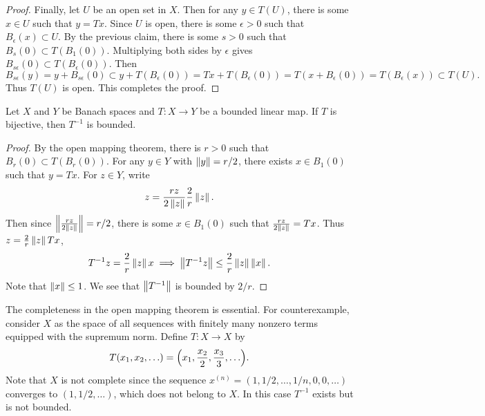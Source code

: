 \begin{proof}
    Finally, let $U$ be an open set in $X$. Then for any $y\in T(U)$, there is 
    some $x\in U$ such that $y = Tx$. Since $U$ is open, there is some $\epsilon>0$ 
    such that $B_\epsilon(x)\subset U$. By the previous claim, there is some $s>0$ 
    such that $B_s(0)\subset T(B_1(0))$. Multiplying both sides by $\epsilon$ gives
    $B_{s\epsilon}(0)\subset T(B_\epsilon(0))$. Then 
    \begin{equation*}
        B_{s\epsilon}(y) = y + B_{s\epsilon}(0) \subset y + T(B_\epsilon(0)) 
        = Tx + T(B_\epsilon(0)) = T(x + B_\epsilon(0))
        = T(B_\epsilon(x)) \subset T(U).
    \end{equation*}
    Thus $T(U)$ is open. This completes the proof.
\end{proof}

\begin{theorem}
    Let $X$ and $Y$ be Banach spaces and $T:X\to Y$ be a bounded linear map. If 
    $T$ is bijective, then $T^{-1}$ is bounded.
\end{theorem}
\begin{proof}
    By the open mapping theorem, there is $r>0$ such that $B_r(0)\subset T(B_r(0))$. 
    For any $y\in Y$ with $\left\lVert {y} \right\rVert = r/2$, there exists $x\in B_1(0)$ such that 
    $y = Tx$. For $z\in Y$, write 
    \begin{equation*}
        z = \frac{rz}{2\left\lVert {z} \right\rVert}\frac{2}{r}\left\lVert {z} \right\rVert.
    \end{equation*}
    Then since $\left\lVert {\frac{rz}{2\left\lVert {z} \right\rVert}} \right\rVert = r/2$, there is some $x\in B_1(0)$ 
    such that $\frac{rz}{2\left\lVert {z} \right\rVert} = Tx$. Thus $z = \frac{2}{r}\left\lVert {z} \right\rVert Tx$, 
    \begin{equation*}
        T^{-1}z = \frac{2}{r}\left\lVert {z} \right\rVert x\implies \left\lVert {T^{-1}z} \right\rVert \leq \frac{2}{r}\left\lVert {z} \right\rVert\left\lVert {x} \right\rVert.
    \end{equation*}
    Note that $\left\lVert {x} \right\rVert\leq 1$. We see that $\left\lVert {T^{-1}} \right\rVert$ is bounded by $2/r$.
\end{proof}
\begin{remark}
    The completeness in the open mapping theorem is essential. For counterexample, 
    consider $X$ as the space of all sequences with finitely many nonzero terms 
    equipped with the supremum norm. Define $T:X\to X$ by 
    \begin{equation*}
        T(x_1,x_2,\ldots) = \pth{x_1, \frac{x_2}{2}, \frac{x_3}{3}, \ldots}.
    \end{equation*}
    Note that $X$ is not complete since the sequence $x^{(n)} = 
    (1,1/2,\ldots,1/n,0,0,\ldots)$ converges to $(1,1/2,\ldots)$, which does not 
    belong to $X$. In this case $T^{-1}$ exists but is not bounded.
\end{remark}

